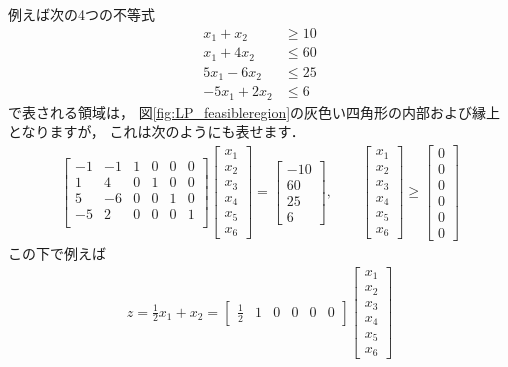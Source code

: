 ﻿\documentclass[a4paper]{jsarticle}
\begin{document}
例えば次の4つの不等式
\begin{align*}
x_{1}+x_{2} &\geq 10
\\
x_{1}+4x_{2} &\leq 60
\\
5x_{1}-6x_{2} &\leq 25
\\
-5x_{1}+2x_{2} &\leq 6
\end{align*}
で表される領域は，
図\ref{fig:LP_feasibleregion}の灰色い四角形の内部および縁上となりますが，
これは次のようにも表せます．
\begin{align*}
\begin{bmatrix}
-1 & -1 & 1 & 0 & 0 & 0 \\
 1 &  4 & 0 & 1 & 0 & 0 \\
 5 & -6 & 0 & 0 & 1 & 0 \\
-5 &  2 & 0 & 0 & 0 & 1 \\
\end{bmatrix}
\begin{bmatrix}
x_{1} \\ x_{2} \\ x_{3} \\ x_{4} \\ x_{5} \\ x_{6}
\end{bmatrix}
=
\begin{bmatrix}
-10
\\
60
\\
25
\\
6
\end{bmatrix}
,\qquad
\begin{bmatrix}
x_{1} \\ x_{2} \\ x_{3} \\ x_{4} \\ x_{5} \\ x_{6}
\end{bmatrix}
\geq
\begin{bmatrix}
0 \\ 0 \\ 0 \\ 0 \\ 0 \\ 0
\end{bmatrix}
\end{align*}
この下で例えば
\begin{align*}
z=\frac{1}{2}x_{1}+x_{2}
=\begin{bmatrix}
\frac{1}{2} & 1 & 0 & 0 & 0 & 0
\end{bmatrix}
\begin{bmatrix}
x_{1} \\ x_{2} \\ x_{3} \\ x_{4} \\ x_{5} \\ x_{6}
\end{bmatrix}
\end{align*}
\end{document}
